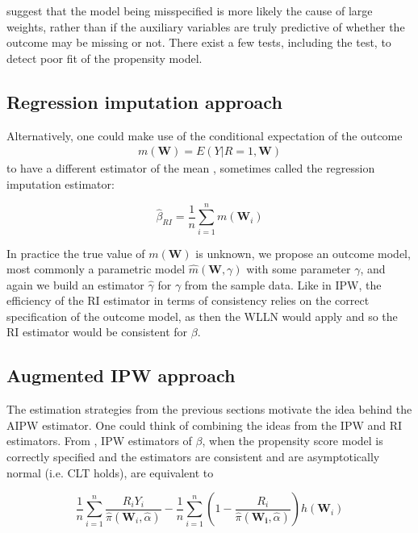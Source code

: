 \documentclass[12pt,twoside]{article}
\begin{document}
\citet{kang} suggest that the model being misspecified is more likely the cause of large weights, rather than if the auxiliary variables are truly predictive of whether the outcome may be missing or not. There exist a few tests, including the \citet{hosmer} test, to detect poor fit of the propensity model.\\

\subsection{Regression imputation approach} 

Alternatively, one could make use of the conditional expectation of the outcome 
\begin{align*}
    m(\mathbf{W}) = E(Y|R= 1,\mathbf{W})
\end{align*}
to have a different estimator of the mean \citep{davidian,vansteelandt}, sometimes called the regression imputation estimator: 

\begin{equation}
    \hat{\beta}_ {RI} = \frac{1}{n}\sum_{i = 1}^n m(\mathbf{W}_i)
\end{equation}

In practice the true value of $m(\mathbf{W})$ is unknown, we propose an outcome model, most commonly a parametric model $\hat m(\mathbf{W}, \gamma)$ with some parameter $\gamma$, and again we build an estimator $\hat{\gamma}$ for $\gamma$ from the sample data. Like in IPW, the efficiency of the RI estimator in terms of consistency relies on the correct specification of the outcome model, as then the WLLN would apply and so the RI estimator would be consistent for $\beta$. \\

\subsection{Augmented IPW approach} 

The estimation strategies from the previous sections motivate the idea behind the AIPW estimator. One could think of combining the ideas from the IPW and RI estimators. From \citet{davidian}, IPW estimators of $\beta$, when the propensity score model is correctly specified and the estimators are consistent and are asymptotically normal (i.e. CLT holds), are equivalent to 

\begin{equation}
    \frac{1}{n}\sum_{i=1}^{n}\frac{R_iY_i}{\hat\pi(\mathbf{W}_i, \hat{\alpha})} - \frac{1}{n}\sum_{i=1}^{n} \left(1 - \frac{R_i}{\hat\pi(\mathbf{W_i},\hat{\alpha})} \right) h(\mathbf{W}_i)
\end{equation}
\end{document}
